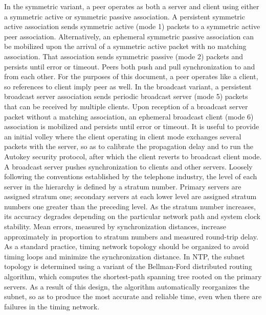 In the symmetric variant, a peer operates as both a server and client
 using either a symmetric active or symmetric passive association. A
 persistent symmetric active association sends symmetric active (mode
 1) packets to a symmetric active peer association. Alternatively, an
 ephemeral symmetric passive association can be mobilized upon the
 arrival of a symmetric active packet with no matching association.
 That association sends symmetric passive (mode 2) packets and
 persists until error or timeout. Peers both push and pull
 synchronization to and from each other. For the purposes of this
 document, a peer operates like a client, so references to client
 imply peer as well.
 In the broadcast variant, a persistent broadcast server association
 sends periodic broadcast server (mode 5) packets that can be received
 by multiple clients. Upon reception of a broadcast server packet
 without a matching association, an ephemeral broadcast client (mode
 6) association is mobilized and persists until error or timeout. It
 is useful to provide an initial volley where the client operating in
 client mode exchanges several packets with the server, so as to
 calibrate the propagation delay and to run the Autokey security
 protocol, after which the client reverts to broadcast client mode. A
 broadcast server pushes synchronization to clients and other servers.
 Loosely following the conventions established by the telephone
 industry, the level of each server in the hierarchy is defined by a
 stratum number. Primary servers are assigned stratum one; secondary
 servers at each lower level are assigned stratum numbers one greater
 than the preceding level. As the stratum number increases, its
 accuracy degrades depending on the particular network path and system
 clock stability. Mean errors, measured by synchronization distances,
 increase approximately in proportion to stratum numbers and measured
 round-trip delay.
 As a standard practice, timing network topology should be organized
 to avoid timing loops and minimize the synchronization distance. In
 NTP, the subnet topology is determined using a variant of the
 Bellman-Ford distributed routing algorithm, which computes the
 shortest-path spanning tree rooted on the primary servers. As a
 result of this design, the algorithm automatically reorganizes the
 subnet, so as to produce the most accurate and reliable time, even
 when there are failures in the timing network.

